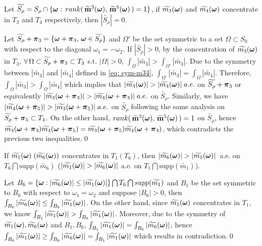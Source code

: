 \begin{lemma}\label{lem: full-rank-m35}
Let $\widetilde{S_\rho} = S_\rho\cap\{\boldsymbol{\omega}:\, rank(\,\widetilde{\mathbf{m}}^{3}(\boldsymbol{\omega}),\,\widetilde{\mathbf{m}}^{5}(\boldsymbol{\omega})\,)= 1\}$, if $\widetilde{m_{3}}(\boldsymbol{\omega})$ and $\widetilde{m_{4}}(\boldsymbol{\omega})$ concentrate in $T_3$ and $T_4$ respectively, then $|\widetilde{S_\rho}|=0$.
\end{lemma}
Let $\widetilde{S_\rho} + \boldsymbol{\pi}_3 = \{\boldsymbol{\omega} + \boldsymbol{\pi}_3,\, \boldsymbol{\omega}\in \widetilde{S_\rho}\}$ and $\Omega'$ be the set symmetric to a set $\Omega\subset S_0$ with respect to the diagonal $\omega_1 = -\omega_2$. If $|\widetilde{S_\rho}|>0$, by the concentration of $\widetilde{m_{3}}(\boldsymbol{\omega})$ in $T_3$, $\forall\, \Omega\subset \widetilde{S_\rho} + \boldsymbol{\pi}_3\subset T_3$ s.t. $|\Omega|> 0$, $\int_{\Omega}|\widetilde{m_3}| > \int_{\Omega'}|\widetilde{m_3}|$. Due to the symmetry between $|\widetilde{m_3}|$ and $|\widetilde{m_4}|$ defined in \eqref{eq: sym-m34}, $\int_{\Omega'}|\widetilde{m_3}| = \int_{\Omega}|\widetilde{m_4}|$. Therefore, $\int_{\Omega}|\widetilde{m_3}| >  \int_\Omega|\widetilde{m_4}|$ which implies that $|\widetilde{m_{3}}(\boldsymbol{\omega})| > |\widetilde{m_{4}}(\boldsymbol{\omega})|\; a.e.$ on $\widetilde{S_\rho}+\boldsymbol{\pi}_3$ or equivalently $|\widetilde{m_3}(\boldsymbol{\omega}+\boldsymbol{\pi}_3)| > |\widetilde{m_4}(\boldsymbol{\omega}+\boldsymbol{\pi}_3)|\; a.e.$ on $\widetilde{S_\rho}$. Similarly, we have $|\widetilde{m_4}(\boldsymbol{\omega}+\boldsymbol{\pi}_5)| > |\widetilde{m_3}(\boldsymbol{\omega}+\boldsymbol{\pi}_5)|\; a.e.$ on $\widetilde{S_\rho}$ following the same analysis on $\widetilde{S_\rho}+\boldsymbol{\pi}_5\subset T_4$.
On the other hand, $rank(\,\widetilde{\mathbf{m}}^{3}(\boldsymbol{\omega}),\,\widetilde{\mathbf{m}}^{5}(\boldsymbol{\omega})\,)= 1$ on $\widetilde{S_\rho}$, hence $\widetilde{m_3}(\boldsymbol{\omega}+\boldsymbol{\pi}_3)\widetilde{m_4}(\boldsymbol{\omega}+\boldsymbol{\pi}_5) = \widetilde{m_3}(\boldsymbol{\omega}+\boldsymbol{\pi}_5)\widetilde{m_4}(\boldsymbol{\omega}+\boldsymbol{\pi}_3)$, which contradicts the previous two inequalities.\qed

\begin{lemma}\label{lem: concentrate}
If $\widetilde{m_{1}}(\boldsymbol{\omega}) \;(\widetilde{m_{6}}(\boldsymbol{\omega}))$ concentrates in $T_1 (T_6)$, then $|\widetilde{m_{6}}(\boldsymbol{\omega})| > |\widetilde{m_{1}}(\boldsymbol{\omega})|\,$ a.e. on $T_6\bigcap \text{supp}(\widetilde{m_6})$ \rm{(}$|\widetilde{m_{1}}(\boldsymbol{\omega})| > |\widetilde{m_{6}}(\boldsymbol{\omega})|$ 
a.e. on $T_1\bigcap\text{supp}(\widetilde{m_1})$\rm{)}.
\end{lemma}
Let $B_6=\{\boldsymbol{\omega}: |\widetilde{m_{6}}(\boldsymbol{\omega})| \leq |\widetilde{m_{1}}(\boldsymbol{\omega})|\}\bigcap T_6\bigcap supp(\widetilde{m_1})$ and $B_1$ be the set symmetric to $B_6$ with respect to $\omega_1 = \omega_2$ and suppose $|B_6|>0$, then $\int_{B_6}|\widetilde{m_{6}}(\boldsymbol{\omega})|\leq \int_{B_6}|\widetilde{m_{1}}(\boldsymbol{\omega})|$. On the other hand, since $\widetilde{m_{1}}(\boldsymbol{\omega})$ concentrates in $T_1$, we know $\int_{B_1}|\widetilde{m_{1}}(\boldsymbol{\omega})| > \int_{B_6}|\widetilde{m_{1}}(\boldsymbol{\omega})|$. Moreover, due to the symmetry of $\widetilde{m_{1}}(\boldsymbol{\omega}),\widetilde{m_{6}}(\boldsymbol{\omega})$ and $B_1,B_6$, $\int_{B_1}|\widetilde{m_{1}}(\boldsymbol{\omega})| = \int_{B_6}|\widetilde{m_{6}}(\boldsymbol{\omega})|$, hence $\int_{B_6}|\widetilde{m_{1}}(\boldsymbol{\omega})| \geq\int_{B_6}|\widetilde{m_{6}}(\boldsymbol{\omega})| = \int_{B_1}|\widetilde{m_{1}}(\boldsymbol{\omega})| $ which results in contradiction.\qed

